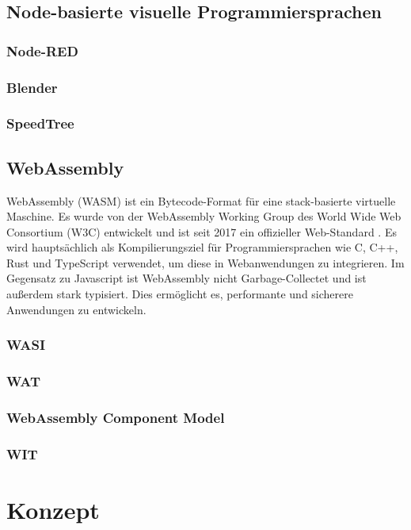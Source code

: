 \documentclass[ngerman]{article}
\begin{document}
\subsection{Node-basierte visuelle Programmiersprachen}
\subsubsection{Node-RED}
\subsubsection{Blender}
\subsubsection{SpeedTree}
\subsection{WebAssembly}
WebAssembly (WASM) ist ein Bytecode-Format für eine stack-basierte virtuelle Maschine. Es wurde von der WebAssembly Working Group des World Wide Web Consortium (W3C) entwickelt und ist seit 2017 ein offizieller Web-Standard \cite{Haas2017}. 
\linebreak
\linebreak
Es wird hauptsächlich als Kompilierungsziel für Programmiersprachen wie C, C++, Rust und TypeScript verwendet, um diese in Webanwendungen zu integrieren. Im Gegensatz zu Javascript ist WebAssembly nicht Garbage-Collectet und ist außerdem stark typisiert. Dies ermöglicht es, performante und sicherere Anwendungen zu entwickeln.
\subsubsection{WASI}
\subsubsection{WAT}
\subsubsection{WebAssembly Component Model}
\subsubsection{WIT}

\section{Konzept}
\end{document}
